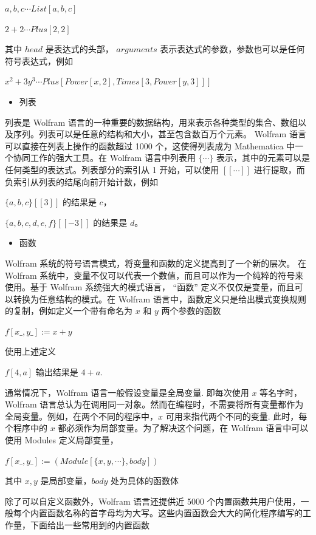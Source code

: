 ${a, b, c} \cdots List[a, b, c]$

$2 + 2 \cdots Plus[2, 2]$

其中 $head$ 是表达式的头部， $arguments$ 表示表达式的参数，参数也可以是任何符号表达式，例如

$x^2 + 3y^3 \cdots Plus[Power[x, 2], Times[3, Power[y, 3]]]$

\begin{itemize}
   \item 列表
\end{itemize}

列表是 Wolfram 语言的一种重要的数据结构，用来表示各种类型的集合、数组以及序列。列表可以是任意的结构和大小，甚至包含数百万个元素。 Wolfram 语言可以直接在列表上操作的函数超过 1000 个，这使得列表成为 Mathematica 中一个协同工作的强大工具。在 Wolfram 语言中列表用 $\{\cdots\}$ 表示，其中的元素可以是任何类型的表达式。列表部分的索引从 1 开始，可以使用 $[[\cdots]]$ 进行提取，而负索引从列表的结尾向前开始计数，例如

$\{a, b, c\}[[3]]$ 的结果是 $c$，

$\{a, b, c, d, e, f\}[[-3]]$ 的结果是 $d$。

\begin{itemize}
    \item 函数
\end{itemize}

Wolfram 系统的符号语言模式，将变量和函数的定义提高到了一个新的层次。 在 Wolfram 系统中，变量不仅可以代表一个数值，而且可以作为一个纯粹的符号来使用。基于 Wolfram 系统强大的模式语言， “函数” 定义不仅仅是变量，而且可以转换为任意结构的模式。在 Wolfram 语言中，函数定义只是给出模式变换规则的复制，例如定义一个带有命名为 $x$ 和 $y$ 两个参数的函数

$f[x\_ , y\_ ]:= x + y$

使用上述定义

$f[4, a]$ 输出结果是 $4 + a$.

通常情况下，Wolfram 语言一般假设变量是全局变量. 即每次使用  $x$ 等名字时，Wolfram 语言总认为在调用同一对象。然而在编程时，不需要将所有变量都作为全局变量。例如，在两个不同的程序中，$x$ 可用来指代两个不同的变量. 此时，每个程序中的 $x$ 都必须作为局部变量。为了解决这个问题，在 Wolfram 语言中可以使用  Modules 定义局部变量，

$f[x\_ , y\_ ]:= (Module[\{x, y, \cdots\}, body])$

其中 $x, y$ 是局部变量，$body$ 处为具体的函数体

除了可以自定义函数外，Wolfram 语言还提供近 5000 个内置函数共用户使用，一般每个内置函数名称的首字母均为大写。这些内置函数会大大的简化程序编写的工作量，下面给出一些常用到的内置函数

